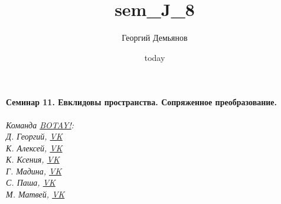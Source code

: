 \documentclass[a4paper,12pt]{article}
\title{sem_J_8}
\author{Георгий Демьянов}
\date{today}
\begin{document}
\paragraph{{\LARGE Семинар 11. Евклидовы пространства. Сопряженное преобразование.}\\}














\begin{center}
	\vfill \emph{{\small 
			Команда \href{https://vk.com/botay_fizteh}{BOTAY!}:\\
			Д. Георгий, \href{https://vk.com/id37346992}{VK}\\
			К. Алексей, \href{https://vk.com/id92540660}{VK}\\
			К. Ксения, \href{https://vk.com/id143862366}{VK}\\
			Г. Мадина, \href{https://vk.com/id226312463}{VK}\\
			С. Паша, \href{https://vk.com/id181006282}{VK}\\
			М. Матвей, \href{https://vk.com/id62009425}{VK}\\
	}}
\end{center}
\end{document}
